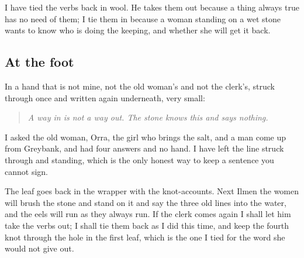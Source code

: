 \documentclass{design/chronicle}
\begin{document}
I have tied the verbs back in wool. He takes them out because a thing always true has no need of them; I tie them in because a woman standing on a wet stone wants to know who is doing the keeping, and whether she will get it back.

\subsection*{At the foot}

In a hand that is not mine, not the old woman’s and not the clerk’s, struck through once and written again underneath, very small:

\begin{quote}\itshape A way in is not a way out. The stone knows this and says nothing.\end{quote}

I asked the old woman, Orra, the girl who brings the salt, and a man come up from Greybank, and had four answers and no hand. I have left the line struck through and standing, which is the only honest way to keep a sentence you cannot sign.

The leaf goes back in the wrapper with the knot-accounts. Next Ilmen the women will brush the stone and stand on it and say the three old lines into the water, and the eels will run as they always run. If the clerk comes again I shall let him take the verbs out; I shall tie them back as I did this time, and keep the fourth knot through the hole in the first leaf, which is the one I tied for the word she would not give out.
\end{document}
